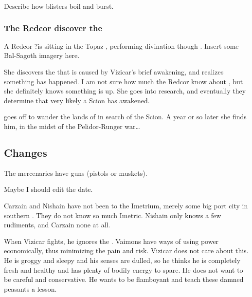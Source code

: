 Describe how blisters boil and burst. 





\subsubsection{The Redcor discover the \vertexspike}
A Redcor \matron\dash\Esmerel?\dash is sitting in the Topaz \Chateau, performing divination though . Insert some Bal-Sagoth imagery here. 


She discovers the \vertexspike{} that is caused by Vizicar's brief awakening, and realizes something has happened. I am not sure how much the Redcor know about \vertices, but she definitely knows something is up. She goes into research, and eventually they determine that very likely a Scion has awakened. 

\Esmerel{} goes off to wander the lands of \Velcad{} in search of the Scion. A year or so later she finds him, in the midst of the Pelidor-Runger war\ldots{}






\subsection{Changes}
The mercenaries have guns (pistols or muskets).

Maybe I should edit the date. 

Carzain and Nishain have not been to the Imetrium, merely some big port city in southern \Scyrum. 
They do not know so much Imetric. 
Nishain only knows a few rudiments, and Carzain none at all. 

When Vizicar fights, he ignores the . 
\Itzach{} Vaimons have ways of using power economically, thus minimizing the pain and risk. 
Vizicar does not care about this. 
He is groggy and sleepy and his senses are dulled, so he thinks he is completely fresh and healthy and has plenty of bodily energy to spare. 
He does not want to be careful and conservative. 
He wants to be flamboyant and teach these damned peasants a lesson. 

